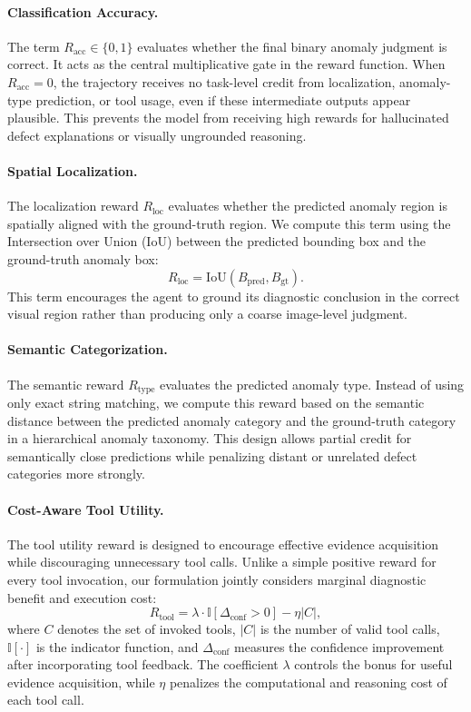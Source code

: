 \documentclass{article}
\begin{document}
{\paragraph{Classification Accuracy.}
The term $R_{\text{acc}} \in \{0,1\}$ evaluates whether the final binary anomaly judgment is correct. 
It acts as the central multiplicative gate in the reward function. 
When $R_{\text{acc}}=0$, the trajectory receives no task-level credit from localization, anomaly-type prediction, or tool usage, even if these intermediate outputs appear plausible. 
This prevents the model from receiving high rewards for hallucinated defect explanations or visually ungrounded reasoning.

\paragraph{Spatial Localization.}
The localization reward $R_{\text{loc}}$ evaluates whether the predicted anomaly region is spatially aligned with the ground-truth region. 
We compute this term using the Intersection over Union (IoU) between the predicted bounding box and the ground-truth anomaly box:
\begin{equation}
R_{\text{loc}} = \text{IoU}(B_{\text{pred}}, B_{\text{gt}}).
\end{equation}
This term encourages the agent to ground its diagnostic conclusion in the correct visual region rather than producing only a coarse image-level judgment.

\paragraph{Semantic Categorization.}
The semantic reward $R_{\text{type}}$ evaluates the predicted anomaly type. 
Instead of using only exact string matching, we compute this reward based on the semantic distance between the predicted anomaly category and the ground-truth category in a hierarchical anomaly taxonomy. 
This design allows partial credit for semantically close predictions while penalizing distant or unrelated defect categories more strongly.

\paragraph{Cost-Aware Tool Utility.}
The tool utility reward is designed to encourage effective evidence acquisition while discouraging unnecessary tool calls. 
Unlike a simple positive reward for every tool invocation, our formulation jointly considers marginal diagnostic benefit and execution cost:
\begin{equation}
R_{\text{tool}} =
\lambda \cdot \mathbb{I}[\Delta_{\text{conf}} > 0]
-
\eta |C|,
\end{equation}
where $C$ denotes the set of invoked tools, $|C|$ is the number of valid tool calls, $\mathbb{I}[\cdot]$ is the indicator function, and $\Delta_{\text{conf}}$ measures the confidence improvement after incorporating tool feedback. 
The coefficient $\lambda$ controls the bonus for useful evidence acquisition, while $\eta$ penalizes the computational and reasoning cost of each tool call.

}
\end{document}
